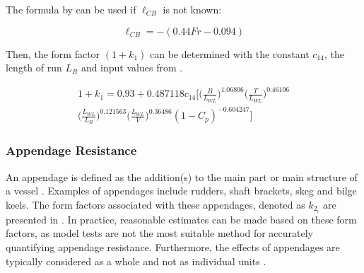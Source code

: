 The formula by  can be used if $\ell_{CB}$ is not known:

\begin{equation}
    \label{eqn:lcb}
    \ell_{CB} = -(0.44Fr - 0.094)
\end{equation}

Then, the form factor $(1+k_1)$ can be determined with the constant $c_{14}$, the length of run $L_R$ and input values from .

\begin{multline}\label{eqn:1+k1}
    1+k_1 = 0.93 + 0.487118c_{14}\Biggl[ \Biggl(\frac{B}{L_{WL}}\Biggr)^{1.06806}  \Biggl(\frac{T}{L_{WL}}\Biggr)^{0.46106} \\ 
    \Biggl(\frac{L_{WL}}{L_R}\Biggr)^{0.121563} \Biggl(\frac{L_{WL}}{V}\Biggr)^{0.36486} (1-C_p)^{-0.604247} \Biggr] 
\end{multline}

\subsubsection*{Appendage Resistance}

An appendage is defined as the addition(s) to the main part or main structure of a vessel . Examples of appendages include rudders, shaft brackets, skeg and bilge keels. The form factors associated with these appendages, denoted as $k_{2_i}$ are presented in . In practice, reasonable estimates can be made based on these form factors, as model tests are not the most suitable method for accurately quantifying appendage resistance. Furthermore, the effects of appendages are typically considered as a whole and not as individual units .\\

